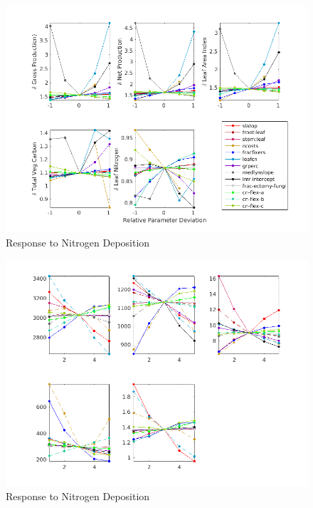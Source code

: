 \documentclass[draft,linenumbers]{agujournal}
\begin{document}
  
  
 \begin{figure}[h]
     \centering
     \includegraphics[width=35pc]{matlab/figures/frac_deviation_CO2_response_1CLM5_1x1pt_US-ORN_ens_transient_ELEV_PI_y1.png}
     \caption{Response to Nitrogen Deposition}
     \label{Oak Ridge CO2 response Parameter Sensitivity}
  \end{figure}
  
  
 \begin{figure}[h]
     \centering
     \includegraphics[width=35pc]{matlab/figures/frac_deviation_CO2_response_1CLM5_BCI__y1.png}
     \caption{Response to Nitrogen Deposition}
     \label{BCI CO2 response Parameter Sensitivity}
  \end{figure}
  
  

  
\end{document}
